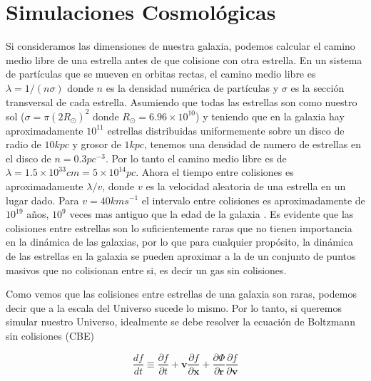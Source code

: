  
\section{Simulaciones Cosmológicas}

Si consideramos las dimensiones de nuestra galaxia, podemos calcular el camino medio libre de una estrella antes de que colisione con otra estrella. En un sistema de partículas que se mueven en orbitas rectas, el camino medio libre es $\lambda = 1/(n\sigma)$ donde $n$ es la densidad numérica de partículas y $\sigma$ es la sección transversal de cada estrella. Asumiendo que todas las estrellas son como nuestro sol ($\sigma = \pi(2R_\odot)^2 $ donde $R_\odot = 6.96\times 10^{10}$) y teniendo que en la galaxia hay aproximadamente $10^{11}$ estrellas distribuidas uniformemente sobre un disco de radio de $10 kpc$ y grosor de $1 kpc$, tenemos una densidad de numero de estrellas en el disco de $n=0.3pc^{-3}$. Por lo tanto el camino medio libre es de $\lambda = 1.5 \times 10^{33} cm = 5\times 10^{14}pc$. Ahora el tiempo entre colisiones es aproximadamente $\lambda / v$, donde $v$ es la velocidad aleatoria de una estrella en un lugar dado. Para $v=40km s^{-1}$ el intervalo entre colisiones es aproximadamente de $10^{19}$ años, $10^9$ veces mas antiguo que la edad de la galaxia \cite{Binney1988-rs}. Es evidente que las colisiones entre estrellas son lo suficientemente raras que no tienen importancia en la dinámica de las galaxias, por lo que para cualquier propósito, la dinámica de las estrellas en la galaxia se pueden aproximar a la de un conjunto de puntos masivos que no colisionan entre si, es decir un gas sin colisiones.

Como vemos que las colisiones entre estrellas de una galaxia son raras, podemos decir que a la escala del Universo sucede lo mismo. Por lo tanto, si queremos simular nuestro Universo, idealmente se debe resolver la ecuación de Boltzmann sin colisiones (CBE)

\begin{equation}
    \frac{d f}{d t} \equiv \frac{\partial f}{\partial t} + \mathbf{v}\frac{\partial f}{\partial \mathbf{x}} + \frac{\partial \Phi}{\partial \mathbf{r}} \frac{\partial f}{\partial \mathbf{v}}
    \label{eq:CBE}
\end{equation}

